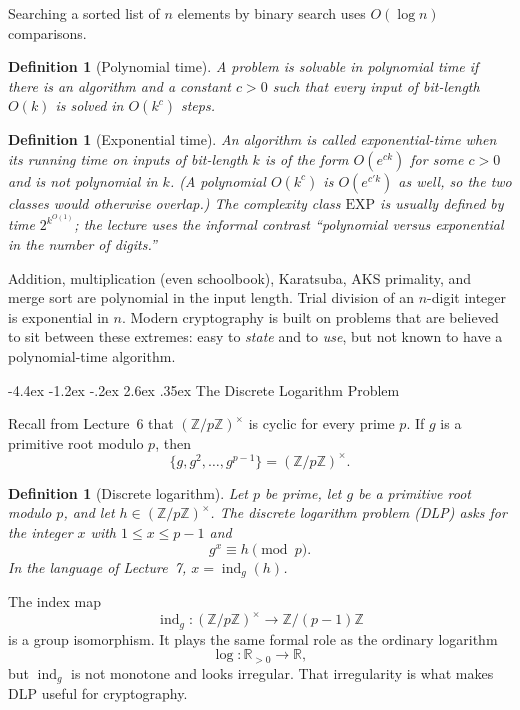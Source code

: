 \documentclass[11pt]{article}
\makeatletter
\renewcommand{\section}{\@startsection{section}{1}{\z@}%
    {-4.4ex \@plus -1.2ex \@minus -.2ex}%
    {2.6ex \@plus .35ex}%
    {\normalfont\Large\bfseries}}
\newtheorem{definition}[theorem]{Definition}
\theoremstyle{remark}
\DeclareMathOperator{\ind}{ind}
\newcommand{\Z}{\mathbb Z}
\newcommand{\R}{\mathbb R}
\newcommand{\units}[1]{\left(\mathbb Z/#1\mathbb Z\right)^\times}
\makeatother
\begin{document}
Searching a sorted list of $n$ elements by binary search uses
$O(\log n)$ comparisons.

\begin{definition}[Polynomial time]
A problem is solvable in polynomial time if there is an algorithm and a
constant $c>0$ such that every input of bit-length $O(k)$ is solved in
$O(k^c)$ steps.
\end{definition}

\begin{definition}[Exponential time]
An algorithm is called exponential-time when its running time on inputs
of bit-length $k$ is of the form $O(e^{ck})$ for some $c>0$ and is
\emph{not} polynomial in $k$. (A polynomial $O(k^c)$ is $O(e^{c'k})$ as
well, so the two classes would otherwise overlap.) The complexity class
$\mathrm{EXP}$ is usually defined by time $2^{k^{O(1)}}$; the lecture
uses the informal contrast ``polynomial versus exponential in the number
of digits.''
\end{definition}

Addition, multiplication (even schoolbook), Karatsuba, AKS primality, and
merge sort are polynomial in the input length. Trial division of an
$n$-digit integer is exponential in $n$. Modern cryptography is built on
problems that are believed to sit between these extremes: easy to
\emph{state} and to \emph{use}, but not known to have a polynomial-time
algorithm.

\section{The Discrete Logarithm Problem}

Recall from Lecture~6 that $\units{p}$ is cyclic for every prime $p$.
If $g$ is a primitive root modulo $p$, then
\[
    \{g,g^2,\ldots,g^{p-1}\} = \units{p}.
\]

\begin{definition}[Discrete logarithm]
Let $p$ be prime, let $g$ be a primitive root modulo $p$, and let
$h\in\units{p}$. The discrete logarithm problem (DLP) asks for the
integer $x$ with $1\le x\le p-1$ and
\[
    g^x \equiv h \pmod{p}.
\]
In the language of Lecture~7, $x=\ind_g(h)$.
\end{definition}

The index map
\[
    \ind_g\colon \units{p} \longrightarrow \Z/(p-1)\Z
\]
is a group isomorphism. It plays the same formal role as the ordinary
logarithm
\[
    \log\colon \R_{>0}\longrightarrow \R,
\]
but $\ind_g$ is not monotone and looks irregular. That irregularity is
what makes DLP useful for cryptography.
\end{document}
